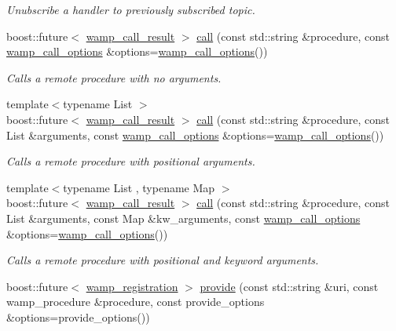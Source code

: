 \begin{DoxyCompactItemize}
\begin{DoxyCompactList}\small\item\em Unubscribe a handler to previously subscribed topic. \end{DoxyCompactList}\item 
boost\+::future$<$ \hyperlink{classautobahn_1_1wamp__call__result}{wamp\+\_\+call\+\_\+result} $>$ \hyperlink{classautobahn_1_1wamp__session_a506a115013039bfa8444353f8d0c93e5}{call} (const std\+::string \&procedure, const \hyperlink{classautobahn_1_1wamp__call__options}{wamp\+\_\+call\+\_\+options} \&options=\hyperlink{classautobahn_1_1wamp__call__options}{wamp\+\_\+call\+\_\+options}())
\begin{DoxyCompactList}\small\item\em Calls a remote procedure with no arguments. \end{DoxyCompactList}\item 
{\footnotesize template$<$typename List $>$ }\\boost\+::future$<$ \hyperlink{classautobahn_1_1wamp__call__result}{wamp\+\_\+call\+\_\+result} $>$ \hyperlink{classautobahn_1_1wamp__session_ab4ebb8d501693b64bbf3419d72eb1d3c}{call} (const std\+::string \&procedure, const List \&arguments, const \hyperlink{classautobahn_1_1wamp__call__options}{wamp\+\_\+call\+\_\+options} \&options=\hyperlink{classautobahn_1_1wamp__call__options}{wamp\+\_\+call\+\_\+options}())
\begin{DoxyCompactList}\small\item\em Calls a remote procedure with positional arguments. \end{DoxyCompactList}\item 
{\footnotesize template$<$typename List , typename Map $>$ }\\boost\+::future$<$ \hyperlink{classautobahn_1_1wamp__call__result}{wamp\+\_\+call\+\_\+result} $>$ \hyperlink{classautobahn_1_1wamp__session_a51e4e1390c1ce847909569be5be27e7e}{call} (const std\+::string \&procedure, const List \&arguments, const Map \&kw\+\_\+arguments, const \hyperlink{classautobahn_1_1wamp__call__options}{wamp\+\_\+call\+\_\+options} \&options=\hyperlink{classautobahn_1_1wamp__call__options}{wamp\+\_\+call\+\_\+options}())
\begin{DoxyCompactList}\small\item\em Calls a remote procedure with positional and keyword arguments. \end{DoxyCompactList}\item 
boost\+::future$<$ \hyperlink{classautobahn_1_1wamp__registration}{wamp\+\_\+registration} $>$ \hyperlink{classautobahn_1_1wamp__session_af69d02081f611e0e433f1f00263ca693}{provide} (const std\+::string \&uri, const wamp\+\_\+procedure \&procedure, const provide\+\_\+options \&options=provide\+\_\+options())

\end{DoxyCompactItemize}
